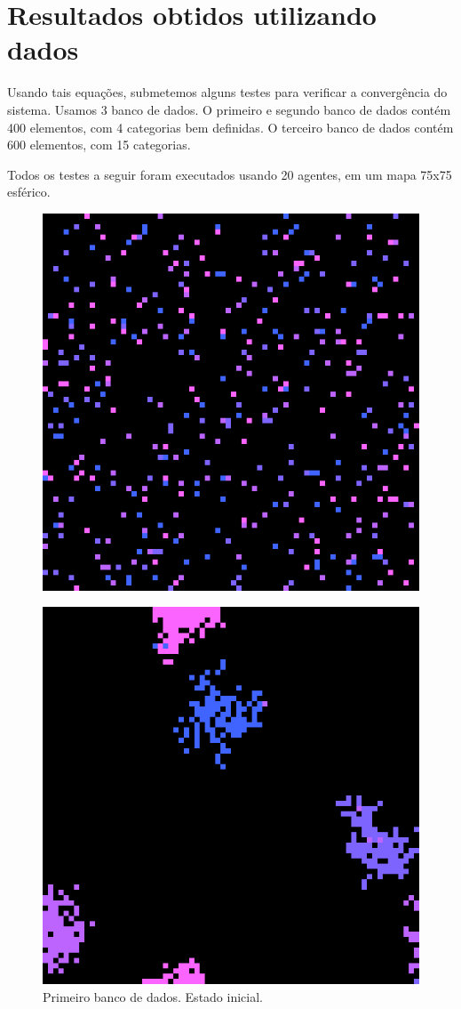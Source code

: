\documentclass[conference]{IEEEtran}
\begin{document}
\section{Resultados obtidos utilizando dados}

Usando tais equações, submetemos alguns testes para verificar a convergência do sistema. Usamos 3 banco de dados. O primeiro e segundo banco de dados contém 400 elementos, com 4 categorias bem definidas.
O terceiro banco de dados contém 600 elementos, com 15 categorias.

Todos os testes a seguir foram executados usando 20 agentes, em um mapa 75x75 esférico.

\begin{figure}[H] 
  \begin{minipage}[b]{0.5\linewidth}
    \label{fig:dataset_one}
    \centering
    \includegraphics[width=.8\linewidth]{resultados/data/dataset_one/2-0.png} 
    \caption{Primeiro banco de dados. Estado inicial.} 
    \vspace{4ex}
  \end{minipage}%
  \begin{minipage}[b]{0.5\linewidth}
    \centering
    \includegraphics[width=.8\linewidth]{resultados/data/dataset_one/2-1.png} 

\end{minipage}
\end{figure}
\end{document}
